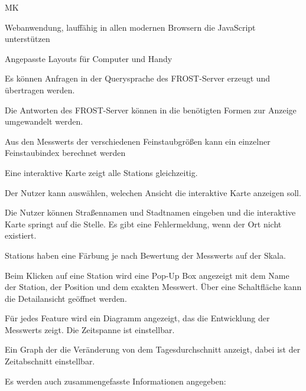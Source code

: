 \begin{Kriterien}{MK}

	\item \gls{Webanwendung}, lauffähig in allen modernen Browsern die JavaScript unterstützen

	\item Angepasste Layouts für Computer und \gls{Handy}
	
	\item Es können Anfragen in der \gls{Querysprache} des \gls{FROST-Server} erzeugt und übertragen werden.
	
	\item Die Antworten des \gls{FROST-Server} können in die benötigten Formen zur Anzeige umgewandelt werden.
	
	\item Aus den \glspl{Messwert} der verschiedenen Feinstaubgrößen kann ein einzelner \gls{Feinstaubindex} berechnet werden

	\item Eine interaktive Karte zeigt alle \glspl{Station} gleichzeitig. 
	
	\item Der Nutzer kann auswählen, welechen Ansicht die interaktive Karte anzeigen soll.
	
	\item Die Nutzer können Straßennamen und Stadtnamen eingeben und die interaktive Karte springt auf die Stelle. Es gibt eine Fehlermeldung, wenn der Ort nicht existiert.

	\item \glspl{Station} haben eine Färbung je nach Bewertung der \glspl{Messwert} auf der Skala.
	
	\item Beim Klicken auf eine \gls{Station} wird eine \gls{Pop-Up} Box angezeigt mit dem Name der Station, der Position und dem exakten Messwert.
		Über eine Schaltfläche kann die Detailansicht geöffnet werden. 
	
	\item Für jedes Feature wird ein Diagramm angezeigt, das die Entwicklung der \glspl{Messwert} zeigt. Die Zeitspanne ist einstellbar.
	
	\item Ein \gls{Graph} der die Veränderung von dem Tagesdurchschnitt anzeigt, dabei ist der Zeitabschnitt einstellbar.
	
	\item Es werden auch zusammengefasste Informationen angegeben: 
\end{Kriterien}
		
